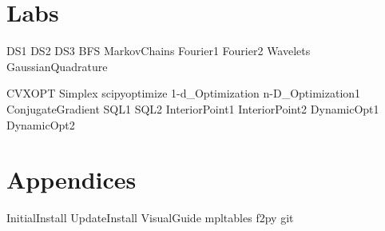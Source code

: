 \documentclass[nociteref]{SIAM-GH-book}
\begin{document}
\part{Labs} %
{DS1}
{DS2}
{DS3}
{BFS}
{MarkovChains}
{Fourier1}
{Fourier2}
{Wavelets}
{GaussianQuadrature}

{CVXOPT}
{Simplex}
{scipyoptimize}
{1-d_Optimization}
{n-D_Optimization1}
{ConjugateGradient} %
{SQL1}
{SQL2}
{InteriorPoint1}
{InteriorPoint2}
{DynamicOpt1}
{DynamicOpt2}

\part{Appendices} %
\begin{appendices}
{InitialInstall}
{UpdateInstall}
{VisualGuide}
{mpltables}
{f2py}
{git}
\end{appendices}
\end{document}
